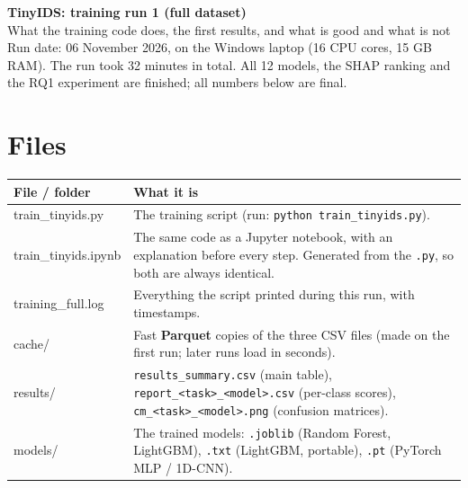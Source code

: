 \documentclass[11pt]{article}
\begin{document}
{\LARGE\bfseries TinyIDS: training run 1 (full dataset)}\\[4pt]
{\large What the training code does, the first results, and what is good and what is not}\\[2pt]
Run date: 06 November 2026, on the Windows laptop (16 CPU cores, 15 GB RAM). The run took 32 minutes in total. All 12 models, the SHAP ranking and the RQ1 experiment are finished; all numbers below are final.

\tableofcontents

\newpage
\section{Files}
\begin{tabular}{@{}>{\ttfamily}l >{\raggedright\arraybackslash}p{11cm}@{}}
\toprule
\textrm{\textbf{File / folder}} & \textbf{What it is} \\
\midrule
train\_tinyids.py & The training script (run: \texttt{python train\_tinyids.py}). \\
train\_tinyids.ipynb & The same code as a Jupyter notebook, with an explanation before every step. Generated from the \texttt{.py}, so both are always identical. \\
training\_full.log & Everything the script printed during this run, with timestamps. \\
cache/ & Fast \textbf{Parquet} copies of the three CSV files (made on the first run; later runs load in seconds). \\
results/ & \texttt{results\_summary.csv} (main table), \texttt{report\_<task>\_<model>.csv} (per-class scores), \texttt{cm\_<task>\_<model>.png} (confusion matrices). \\
models/ & The trained models: \texttt{.joblib} (Random Forest, LightGBM), \texttt{.txt} (LightGBM, portable), \texttt{.pt} (PyTorch MLP / 1D-CNN). \\
\bottomrule
\end{tabular}
\end{document}
